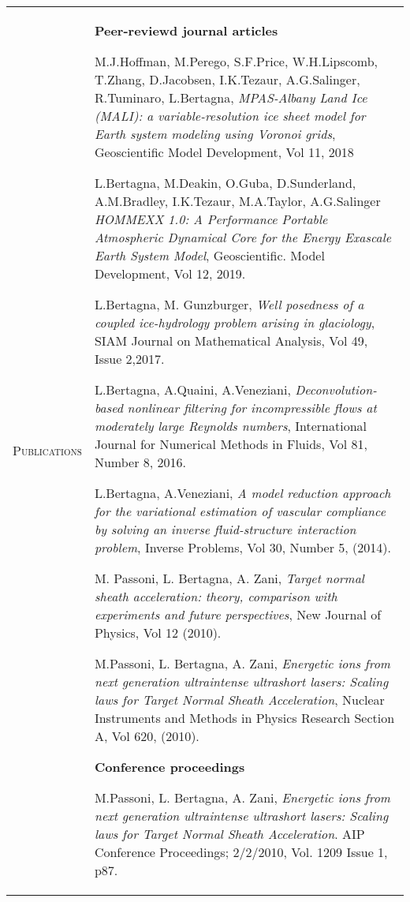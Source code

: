 \documentclass[10pt]{article}
\begin{document}
\newpage
\begin{tabular}{p{2.5cm}|p{15.5cm}}
\textsc{Publications} & \textbf{Peer-reviewd journal articles}
\vspace*{0.2cm}

M.J.Hoffman, M.Perego, S.F.Price, W.H.Lipscomb, T.Zhang, D.Jacobsen, I.K.Tezaur, A.G.Salinger, R.Tuminaro, L.Bertagna, \textit{MPAS-Albany Land Ice (MALI): a variable-resolution ice sheet model for Earth system modeling using Voronoi grids}, Geoscientific Model Development, Vol 11, 2018
\vspace*{0.2cm}

L.Bertagna, M.Deakin, O.Guba, D.Sunderland, A.M.Bradley, I.K.Tezaur, M.A.Taylor, A.G.Salinger \textit{HOMMEXX 1.0: A Performance Portable Atmospheric Dynamical Core for the Energy Exascale Earth System Model}, Geoscientific. Model Development, Vol 12, 2019.
\vspace*{0.2cm}

L.Bertagna, M. Gunzburger, \textit{Well posedness of a coupled ice-hydrology problem arising in glaciology}, SIAM Journal on Mathematical Analysis, Vol 49, Issue 2,2017.
\vspace*{0.2cm}

L.Bertagna, A.Quaini, A.Veneziani, \textit{Deconvolution-based nonlinear filtering for incompressible flows at moderately large Reynolds numbers}, International Journal for Numerical Methods in Fluids, Vol 81, Number 8, 2016.
\vspace*{0.2cm}

L.Bertagna, A.Veneziani, \textit{A model reduction approach for the variational estimation of vascular compliance by solving an inverse fluid-structure interaction problem}, Inverse Problems, Vol 30, Number 5, (2014).
\vspace*{0.2cm}

M. Passoni, L. Bertagna, A. Zani, \textit{Target normal sheath acceleration: theory, comparison with experiments and future perspectives}, New Journal of Physics, Vol 12 (2010).
\vspace*{0.2cm}

M.Passoni, L. Bertagna, A. Zani, \textit{Energetic ions from next generation ultraintense ultrashort lasers: Scaling laws for Target Normal Sheath Acceleration}, Nuclear Instruments and Methods in Physics Research Section A, Vol 620, (2010).
\vspace*{0.2cm}

\textbf{Conference proceedings}

\vspace*{0.2cm}
M.Passoni, L. Bertagna, A. Zani, \textit{Energetic ions from next generation ultraintense ultrashort lasers: Scaling laws for Target Normal Sheath Acceleration}. AIP Conference Proceedings; 2/2/2010, Vol. 1209 Issue 1, p87.


\end{tabular}
\end{document}
